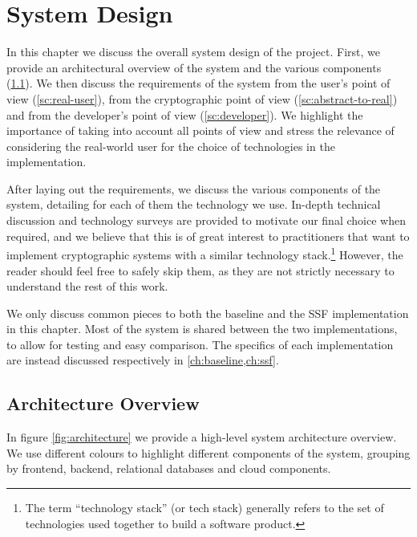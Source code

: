 \chapter{System Design}\label{ch:setup}

In this chapter we discuss the overall system design of the project.
First, we provide an architectural overview
of the system and the various components (\cref{sc:architectural-overview}).
We then discuss the requirements of the system from the user's point of view
(\cref{sc:real-user}), from the cryptographic point of view
(\cref{sc:abstract-to-real}) and from the developer's point of view
(\cref{sc:developer}). We highlight the importance
of taking into account all points of view and stress the 
relevance of considering the real-world
user for the choice of technologies in the implementation. 

After laying out the requirements, we discuss the various
components of the system, detailing for each of them
the technology we use. In-depth technical
discussion and technology surveys are provided
to motivate our final choice when required, and we believe
that this is of great interest to practitioners
that want to implement cryptographic systems with 
a similar technology stack.\footnote{The term ``technology stack'' (or tech stack) generally refers to the set of technologies used together to build a software product.}
However, the reader should feel free to safely skip
them, as they are not strictly necessary to understand 
the rest of this work.

We only discuss common
pieces to both the baseline and the SSF implementation
in this chapter. Most of the system is
shared between the two implementations, to allow
for testing and easy comparison.
The specifics of each implementation are instead discussed respectively in \cref{ch:baseline,ch:ssf}.

\section{Architecture Overview}\label{sc:architectural-overview}

In figure \cref{fig:architecture} we provide a high-level system architecture overview.
We use different colours to highlight different components of the system, grouping
by frontend, backend, relational databases and cloud components.

